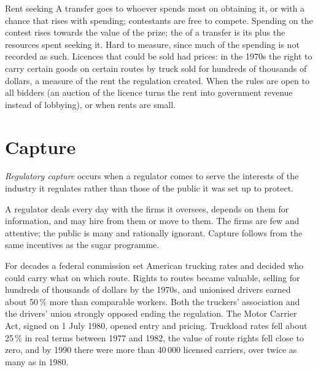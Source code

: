 \begin{model}{Rent seeking}
\assumes A transfer goes to whoever spends most on obtaining it, or with a chance that rises with spending; contestants are free to compete.
\predicts Spending on the contest rises towards the value of the prize; the  of a transfer is its  plus the resources spent seeking it.
\tested Hard to measure, since much of the spending is not recorded as such. Licences that could be sold had prices: in the 1970s the right to carry certain goods on
  certain routes by truck sold for hundreds of thousands of dollars, a measure of the rent the regulation created.
\breaks When the rules are open to all bidders (an auction of the licence turns the rent into government revenue instead of lobbying), or when rents are small.
\end{model}

\section{Capture}\label{sec:g11:public-choice-first-look:capture}

\begin{definition}\label{def:g11:public-choice-first-look:capture}
\emph{Regulatory capture} occurs when a regulator comes to serve the interests of the industry it regulates rather than those of the public it
was set up to protect.
\end{definition}

A regulator deals every day with the firms it oversees, depends on them for information, and may hire from them or move to them. The firms are few and attentive; the
public is many and rationally ignorant. Capture follows from the same incentives as the sugar programme.

\begin{record}
For decades a federal commission set American trucking rates and decided who could carry what on which route. Rights to routes became valuable, selling for hundreds of
thousands of dollars by the 1970s, and unionised drivers earned about 50\,\% more than comparable workers. Both the truckers' association and the drivers' union strongly
opposed ending the regulation. The Motor Carrier Act, signed on 1 July 1980, opened entry and pricing. Truckload rates fell about 25\,\% in real terms between 1977 and
1982, the value of route rights fell close to zero, and by 1990 there were more than 40\,000 licensed carriers, over twice as many as in 1980.
\end{record}

